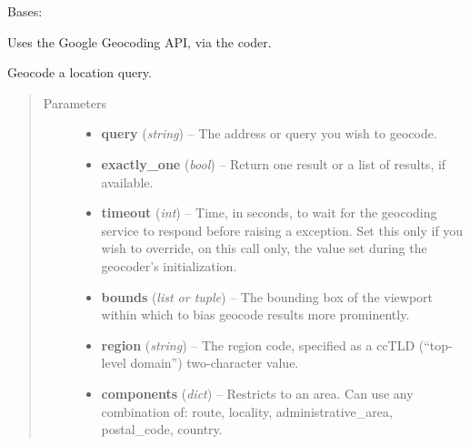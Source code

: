 \documentclass[letterpaper,10pt,english]{sphinxmanual}
\begin{document}
\begin{fulllineitems}
\label{tethne.services.geocode:tethne.services.geocode.GoogleCoder}
Bases: {\hyperref[tethne.services.geocode:tethne.services.geocode.BaseCoder]{}}

Uses the Google Geocoding API, via the  coder.

\begin{fulllineitems}
\label{tethne.services.geocode:tethne.services.geocode.GoogleCoder.code}
Geocode a location query.
\begin{quote}\begin{description}
\item[{Parameters}] \leavevmode\begin{itemize}
\item {} 
\textbf{query} (\emph{string}) -- The address or query you wish to geocode.

\item {} 
\textbf{exactly\_one} (\emph{bool}) -- Return one result or a list of results, if
available.

\item {} 
\textbf{timeout} (\emph{int}) -- 
Time, in seconds, to wait for the geocoding service
to respond before raising a 
exception. Set this only if you wish to override, on this call
only, the value set during the geocoder's initialization.



\item {} 
\textbf{bounds} (\emph{list or tuple}) -- The bounding box of the viewport within which
to bias geocode results more prominently.

\item {} 
\textbf{region} (\emph{string}) -- The region code, specified as a ccTLD
(``top-level domain'') two-character value.

\item {} 
\textbf{components} (\emph{dict}) -- 
Restricts to an area. Can use any combination
of: route, locality, administrative\_area, postal\_code, country.


\end{itemize}
\end{description}
\end{quote}
\end{fulllineitems}
\end{fulllineitems}
\end{document}
